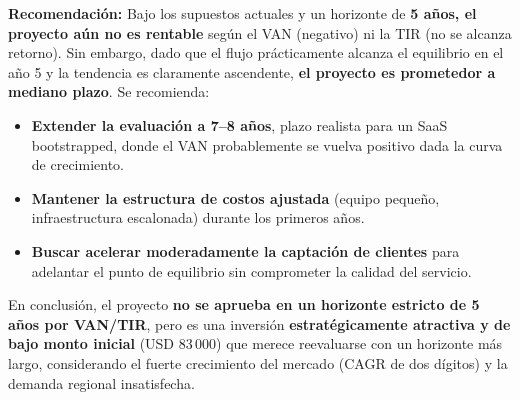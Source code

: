 \noindent\textbf{Recomendación:} Bajo los supuestos actuales y un horizonte de
\textbf{5 años, el proyecto aún no es rentable} según el VAN (negativo) ni la TIR (no
se alcanza retorno). Sin embargo, dado que el flujo prácticamente alcanza el equilibrio
en el año 5 y la tendencia es claramente ascendente, \textbf{el proyecto es prometedor
a mediano plazo}. Se recomienda:
\begin{itemize}
  \item[(a)] \textbf{Extender la evaluación a 7--8 años}, plazo realista para un SaaS
        bootstrapped, donde el VAN probablemente se vuelva positivo dada la curva de
        crecimiento.
  \item[(b)] \textbf{Mantener la estructura de costos ajustada} (equipo pequeño,
        infraestructura escalonada) durante los primeros años.
  \item[(c)] \textbf{Buscar acelerar moderadamente la captación de clientes} para
        adelantar el punto de equilibrio sin comprometer la calidad del servicio.
\end{itemize}

En conclusión, el proyecto \textbf{no se aprueba en un horizonte estricto de 5 años por
VAN/TIR}, pero es una inversión \textbf{estratégicamente atractiva y de bajo monto
inicial} (USD 83\,000) que merece reevaluarse con un horizonte más largo, considerando
el fuerte crecimiento del mercado (CAGR de dos dígitos) y la demanda regional
insatisfecha.
